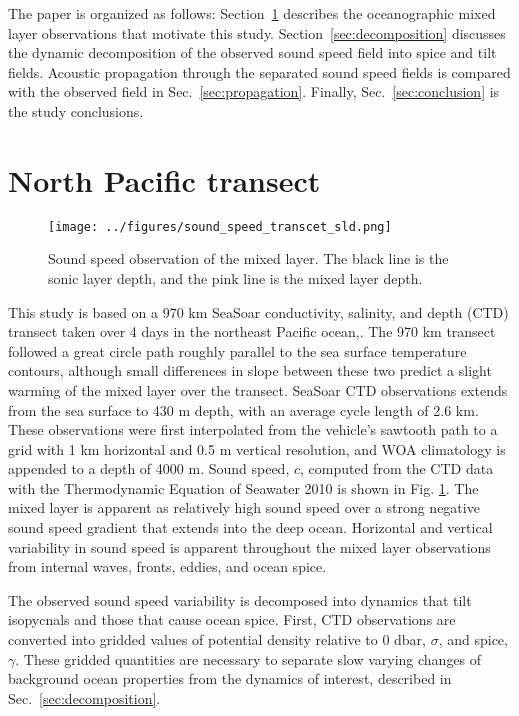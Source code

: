 \documentclass[preprint,NumberedRefs]{JASA}
\begin{document}
The paper is organized as follows: Section~\ref{sec:transcet} describes the oceanographic mixed layer observations that motivate this study. Section~\ref{sec:decomposition} discusses the dynamic decomposition of the observed sound speed field into spice and tilt fields. Acoustic propagation through the separated sound speed fields is compared with the observed field in Sec.~\ref{sec:propagation}. Finally, Sec.~\ref{sec:conclusion} is the study conclusions.

\section{North Pacific transect}\label{sec:transcet}
\begin{figure}
\texttt{[image: ../figures/sound\_speed\_transcet\_sld.png]}
\caption{\label{fig:c_grid}{Sound speed observation of the mixed layer. The black line is the sonic layer depth, and the pink line is the mixed layer depth.}}
\end{figure}

This study is based on a 970 km SeaSoar conductivity, salinity, and depth (CTD) transect taken over 4 days in the northeast Pacific ocean,\citep{cole2010seasonal}. The 970 km transect followed a great circle path roughly parallel to the sea surface temperature contours, although small differences in slope between these two predict a slight warming of the mixed layer over the transect. SeaSoar CTD observations extends from the sea surface to 430 m depth, with an average cycle length of 2.6 km. These observations were first interpolated from the vehicle's sawtooth path to a grid with 1 km horizontal and 0.5 m vertical resolution\citep{colosi2020observations}, and WOA climatology is appended to a depth of 4000 m\citep{WOA}. Sound speed, $c$, computed from the CTD data with the Thermodynamic Equation of Seawater 2010\cite{TEOS-10} is shown in Fig. \ref{fig:c_grid}. The mixed layer is apparent as relatively high sound speed over a strong negative sound speed gradient that extends into the deep ocean. Horizontal and vertical variability in sound speed is apparent throughout the mixed layer observations from internal waves, fronts, eddies, and ocean spice\citep{colosi2020observations}.

The observed sound speed variability is decomposed into dynamics that tilt isopycnals and those that cause ocean spice. First, CTD observations are converted into gridded values of potential density relative to 0 dbar, $\sigma$, and spice, $\gamma$. These gridded quantities are necessary to separate slow varying changes of background ocean properties from the dynamics of interest\cite{dzieciuch2004}, described in Sec.~\ref{sec:decomposition}.
\end{document}
